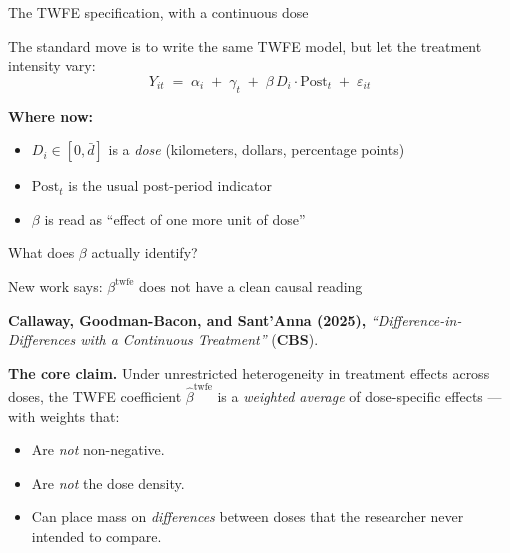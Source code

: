 \documentclass[aspectratio=169,12pt,t]{beamer}
\begin{document}
\begin{frame}{The TWFE specification, with a continuous dose}
\vspace{0.2cm}

The standard move is to write the same TWFE model, but let the treatment intensity vary:
\[
Y_{it} \;=\; \alpha_i \;+\; \gamma_t \;+\; \beta\, D_i \cdot \text{Post}_t \;+\; \varepsilon_{it}
\]

\vspace{0.4cm}

\textbf{Where now:}
\begin{itemize}\small\setlength\itemsep{1pt}
  \item $D_i \in [0, \bar d]$ \;is a \textit{dose} (kilometers, dollars, percentage points)
  \item $\text{Post}_t$ \;is the usual post-period indicator
  \item $\beta$ \;is read as ``effect of one more unit of dose''
\end{itemize}

\vspace{0.3cm}

 \;What does $\beta$ actually identify?
\end{frame}

\begin{frame}{New work says: $\beta^{\text{twfe}}$ does not have a clean causal reading}
\vspace{0.2cm}

\textbf{Callaway, Goodman-Bacon, and Sant'Anna (2025),} \;\textit{``Difference-in-Differences with a Continuous Treatment''} (\textbf{CBS}).

\vspace{0.4cm}

\textbf{The core claim.} \;Under unrestricted heterogeneity in treatment effects across doses, the TWFE coefficient $\widehat\beta^{\text{twfe}}$ is a \textit{weighted average} of dose-specific effects --- with weights that:
\begin{itemize}\small\setlength\itemsep{0pt}
  \item Are \textit{not} non-negative.
  \item Are \textit{not} the dose density.
  \item Can place mass on \textit{differences} between doses that the researcher never intended to compare.
\end{itemize}

\vspace{0.3cm}
\end{frame}
\end{document}
